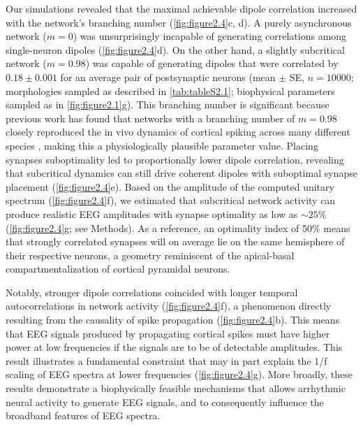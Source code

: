 Our simulations revealed that the maximal achievable dipole correlation increased with the network’s branching number (\autoref{fig:figure2.4}c, d). A purely asynchronous network ($m=0$) was unsurprisingly incapable of generating correlations among single-neuron dipoles (\autoref{fig:figure2.4}d). On the other hand, a slightly subcritical network ($m=0.98$) was capable of generating dipoles that were correlated by $0.18 \pm 0.001$ for an average pair of postsynaptic neurons (mean $\pm$ SE, $n=10000$; morphologies sampled as described in \autoref{tab:tableS2.1}; biophysical parameters sampled as in \autoref{fig:figure2.1}g). This branching number is significant because previous work has found that networks with a branching number of $m=0.98$ closely reproduced the in vivo dynamics of cortical spiking across many different species \cite{Suryadi2022, Wilting2019}, making this a physiologically plausible parameter value. Placing synapses suboptimality led to proportionally lower dipole correlation, revealing that subcritical dynamics can still drive coherent dipoles with suboptimal synapse placement (\autoref{fig:figure2.4}e). Based on the amplitude of the computed unitary spectrum (\autoref{fig:figure2.4}f), we estimated that subcritical network activity can produce realistic EEG amplitudes with synapse optimality as low as ${\sim}25$\% (\autoref{fig:figure2.4}g; see Methods). As a reference, an optimality index of 50\% means that strongly correlated synapses will on average lie on the same hemisphere of their respective neurons, a geometry reminiscent of the apical-basal compartmentalization of cortical pyramidal neurons. 

Notably, stronger dipole correlations coincided with longer temporal autocorrelations in network activity (\autoref{fig:figure2.4}f), a phenomenon directly resulting from the causality of spike propagation (\autoref{fig:figure2.4}b). This means that EEG signals produced by propagating cortical spikes must have higher power at low frequencies if the signals are to be of detectable amplitudes. This result illustrates a fundamental constraint that may in part explain the 1/f scaling of EEG spectra at lower frequencies (\autoref{fig:figure2.4}g). More broadly, these results demonstrate a biophysically feasible mechanisms that allows arrhythmic neural activity to generate EEG signals, and to consequently influence the broadband features of EEG spectra.

